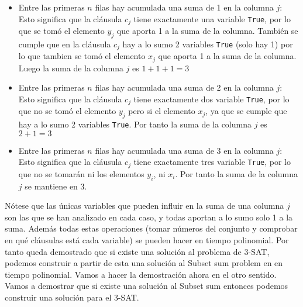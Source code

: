 \documentclass[11pt]{article}
\begin{document}
    \begin{itemize}
        \item Entre las primeras $n$ filas hay acumulada una suma de 1 en la columna $j$: Esto significa que la cláusula
              $c_j$ tiene exactamente una variable \texttt{True}, por lo que se tomó el elemento $y_j$ que aporta 1 a la
              suma de la columna. También se cumple que en la cláusula $c_j$ hay a lo sumo 2 variables \texttt{True} (solo
              hay 1) por lo que tambien se tomó el elemento $x_j$ que aporta 1 a la suma de la columna. Luego la suma de la
              columna $j$ es $1 + 1 + 1 = 3$
        \item Entre las primeras $n$ filas hay acumulada una suma de 2 en la columna $j$: Esto significa que la cláusula
              $c_j$ tiene exactamente dos variable \texttt{True}, por lo que no se tomó el elemento $y_j$ pero si el elemento $x_j$,
              ya que se cumple que hay a lo sumo 2 variables \texttt{True}. Por tanto la suma de la columna $j$ es $2 + 1 = 3$
        \item Entre las primeras $n$ filas hay acumulada una suma de 3 en la columna $j$: Esto significa que la cláusula
              $c_j$ tiene exactamente tres variable \texttt{True}, por lo que no se tomarán ni los elementos $y_i$, ni $x_i$.
              Por tanto la suma de la columna $j$ se mantiene en 3.
    \end{itemize}

    Nótese que las únicas variables que pueden influir en la suma de una columna $j$ son las que se han analizado
    en cada caso, y todas aportan a lo sumo solo 1 a la suma. Además todas estas operaciones (tomar números del conjunto
    y comprobar en qué cláusulas está cada variable) se pueden hacer en tiempo polinomial. Por tanto queda demostrado que 
    si existe una solución al problema de 3-SAT, podemos construir a partir de esta una solución al Subset sum problem en
    en tiempo polinomial. Vamos a hacer la demostración ahora en el otro sentido. Vamos a demostrar que si existe una 
    solución al Subset sum entonces podemos construir una solución para el 3-SAT.\\[10pt]
\end{document}
